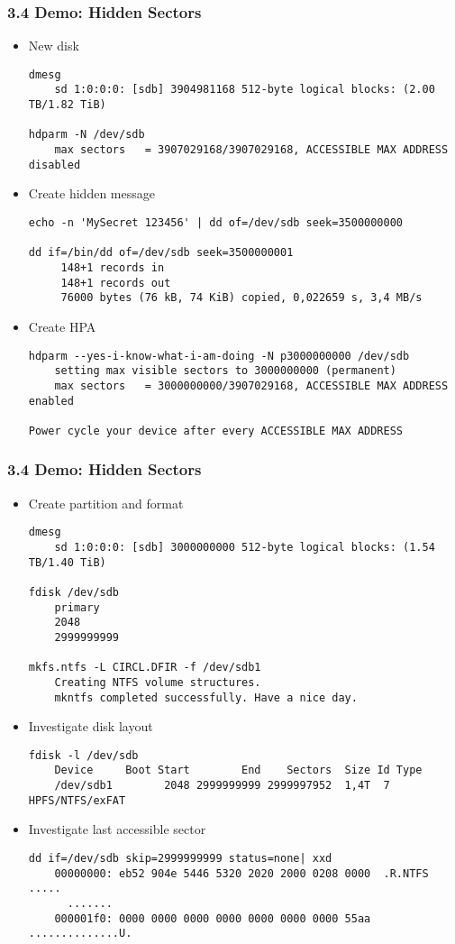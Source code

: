 \begin{frame}[fragile]
  \frametitle{3.4 Demo: Hidden Sectors}
    \begin{itemize}
        \item New disk
\begin{lstlisting}[basicstyle=\tiny]
dmesg
    sd 1:0:0:0: [sdb] 3904981168 512-byte logical blocks: (2.00 TB/1.82 TiB)

hdparm -N /dev/sdb
    max sectors   = 3907029168/3907029168, ACCESSIBLE MAX ADDRESS disabled
\end{lstlisting}
        \item Create hidden message
\begin{lstlisting}[basicstyle=\tiny]
echo -n 'MySecret 123456' | dd of=/dev/sdb seek=3500000000

dd if=/bin/dd of=/dev/sdb seek=3500000001
     148+1 records in
     148+1 records out
     76000 bytes (76 kB, 74 KiB) copied, 0,022659 s, 3,4 MB/s
\end{lstlisting}
        \item Create HPA
\begin{lstlisting}[basicstyle=\tiny]
hdparm --yes-i-know-what-i-am-doing -N p3000000000 /dev/sdb
    setting max visible sectors to 3000000000 (permanent)
    max sectors   = 3000000000/3907029168, ACCESSIBLE MAX ADDRESS enabled

Power cycle your device after every ACCESSIBLE MAX ADDRESS
\end{lstlisting}
    \end{itemize}
\end{frame}


\begin{frame}[fragile]
  \frametitle{3.4 Demo: Hidden Sectors}
    \begin{itemize}
        \item Create partition and format
\begin{lstlisting}[basicstyle=\tiny]
dmesg
    sd 1:0:0:0: [sdb] 3000000000 512-byte logical blocks: (1.54 TB/1.40 TiB)

fdisk /dev/sdb
    primary
    2048
    2999999999

mkfs.ntfs -L CIRCL.DFIR -f /dev/sdb1
    Creating NTFS volume structures.
    mkntfs completed successfully. Have a nice day.
\end{lstlisting}
        \item Investigate disk layout
\begin{lstlisting}[basicstyle=\tiny]
fdisk -l /dev/sdb
    Device     Boot Start        End    Sectors  Size Id Type
    /dev/sdb1        2048 2999999999 2999997952  1,4T  7 HPFS/NTFS/exFAT
\end{lstlisting}
        \item Investigate last accessible sector
\begin{lstlisting}[basicstyle=\tiny]
dd if=/dev/sdb skip=2999999999 status=none| xxd
    00000000: eb52 904e 5446 5320 2020 2000 0208 0000  .R.NTFS    .....
      .......
    000001f0: 0000 0000 0000 0000 0000 0000 0000 55aa  ..............U.
\end{lstlisting}
    \end{itemize}
\end{frame}


